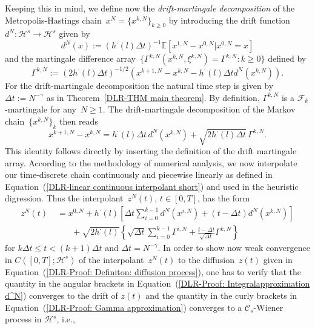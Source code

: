 Keeping this in mind, we define now the \textit{drift-martingale decomposition} of the Metropolis-Hastings chain~$x^N = \{ x^{k,N} \}_{k \geq 0}$ by introducing the drift function~$d^N: \mathcal{H}^s \to \mathcal{H}^s$ given by
\begin{equation}
\label{DLR-Proof: Definition drift function d^N}
d^N (x) := \left(  h^{\cdot}(l) \Delta t \right)^{-1} \mathbb{E} \left[ x^{1,N} - x^{0,N} | x^{0,N} = x \right] 
\end{equation}
and the martingale difference array~$\{ \Gamma^{k,N} (x^{k,N}, \xi^{k,N})= \Gamma^{k,N} : k \geq 0 \}$ defined by
\begin{equation}
 \label{DLR-Proof: Definiton martingale difference array}
 \Gamma^{k,N} := \left( 2 h^{\cdot}(l) \Delta t \right)^{-1/2} \left( x^{k+1,N} -x^{k,N} - h^{\cdot}(l) \Delta t d^N (x^{k,N})  \right).
\end{equation}
For the drift-martingale decomposition the natural time step is given by $\Delta t := N^{-\gamma}$ as in Theorem~\ref{DLR-THM main theorem}. By definition, $\Gamma^{k,N}$ is a $\mathcal{F}_k$-martingale for any~$N\geq1$. The drift-martingale decomposition of the Markov chain~$\{ x^{k,N} \}_{k}$ then reads
\begin{equation}
 \label{DLR-Proof: Definition drift-martingale decomposition}
 x^{k+1,N} - x^{k,N} = h^{\cdot}(l) \Delta t \, d^N(x^{k,N}) + \sqrt{2 h^{\cdot}(l) \Delta t} \, \Gamma^{k,N}.
\end{equation}
This identity follows directly by inserting the definition of the drift martingale array. According to the methodology of numerical analysis, we now interpolate our time-discrete chain continuously and piecewise linearly as defined in Equation~(\ref{DLR-linear continuous interpolant short}) and used in the heuristic digression. Thus the interpolant~$z^N(t)$, $t \in [0,T]$, has the form 
\begin{align}
  z^N(t) & \; = x^{0,N} + h^{\cdot}(l) \left[ \Delta t \sum_{i=0}^{k-1} d^N(x^{i,N}) + (t - \Delta t) d^N(x^{k,N}) \right] \label{DLR-Proof: Integralapproximation d^N} \\ 
  & \qquad + \sqrt{2 h^{\cdot}(l)} \left\{ \sqrt{ \Delta t} \sum_{i=0}^{k-1} \Gamma^{i,N} +  \frac{t - \Delta t}{\sqrt{\Delta t}} \Gamma^{k,N} \right\} \label{DLR-Proof: Gamma approximation}
\end{align}
for $k \Delta t \leq t  < (k+1) \Delta t $ and $\Delta t = N^{-\gamma}$. In order to show now weak convergence in $C([0,T];\mathcal{H}^s)$ of the interpolant~$z^N(t)$ to the diffusion~$z(t)$ given in Equation~(\ref{DLR-Proof: Definiton: diffusion process}), one has to verify that the quantity in the angular brackets in Equation~(\ref{DLR-Proof: Integralapproximation d^N}) converges to the drift of $z(t)$ and the quantity in the curly brackets in Equation~(\ref{DLR-Proof: Gamma approximation}) converges to a $\mathcal{C}_s$-Wiener process in $\mathcal{H}^s$, i.e.,
